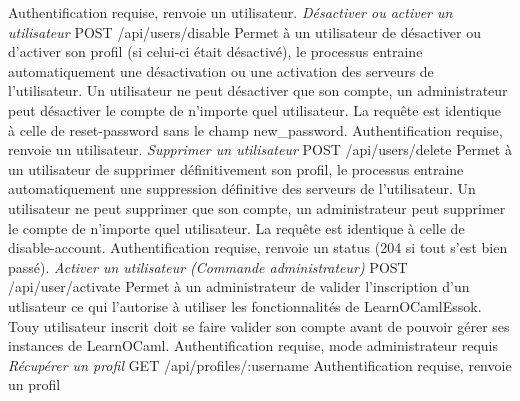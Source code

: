 \documentclass{article}
\begin{document}
Authentification requise, renvoie un utilisateur.
\newline
\newline
\textit{Désactiver ou activer un utilisateur}
\newline
POST /api/users/disable
\newline
Permet à un utilisateur de désactiver ou d'activer son profil (si celui-ci était désactivé), le processus entraine automatiquement une désactivation ou une activation des serveurs de l'utilisateur.
\newline
Un utilisateur ne peut désactiver que son compte, un administrateur peut désactiver le compte de n'importe quel utilisateur.
\newline
La requête est identique à celle de reset-password sans le champ new\_password.
\newline
Authentification requise, renvoie un utilisateur.
\newline
\newline
\textit{Supprimer un utilisateur}
\newline
POST /api/users/delete
\newline
Permet à un utilisateur de supprimer définitivement son profil, le processus entraine automatiquement une suppression définitive des serveurs de l'utilisateur.
\newline
Un utilisateur ne peut supprimer que son compte, un administrateur peut supprimer le compte de n'importe quel utilisateur.
\newline
La requête est identique à celle de disable-account.
\newline
Authentification requise, renvoie un status (204 si tout s'est bien passé).
\newline
\newline
\textit{Activer un utilisateur (Commande administrateur)}
\newline
POST /api/user/activate
\newline
Permet à un administrateur de valider l'inscription d'un utlisateur ce qui l'autorise à utiliser les fonctionnalités de LearnOCamlEssok.
\newline
Touy utilisateur inscrit doit se faire valider son compte avant de pouvoir gérer ses instances de LearnOCaml.
\newline
Authentification requise, mode administrateur requis
\newpage
\textit{Récupérer un profil}
\newline
GET /api/profiles/:username
\newline
Authentification requise, renvoie un profil
\end{document}
